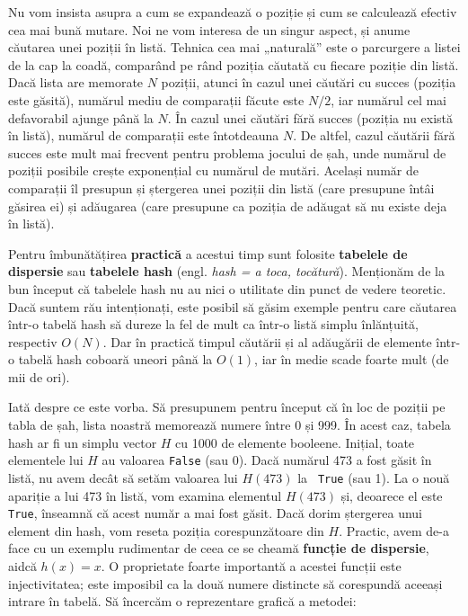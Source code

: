Nu vom insista asupra a cum se expandează o poziție și cum se calculează
efectiv cea mai bună mutare. Noi ne vom interesa de un singur aspect, și anume
căutarea unei poziții în listă. Tehnica cea mai „naturală” este o parcurgere a
listei de la cap la coadă, comparând pe rând poziția căutată cu fiecare
poziție din listă. Dacă lista are memorate $N$ poziții, atunci în cazul unei
căutări cu succes (poziția este găsită), numărul mediu de comparații făcute
este $N/2$, iar numărul cel mai defavorabil ajunge până la $N$. În cazul unei
căutări fără succes (poziția nu există în listă), numărul de comparații este
întotdeauna $N$. De altfel, cazul căutării fără succes este mult mai frecvent
pentru problema jocului de șah, unde numărul de poziții posibile crește
exponențial cu numărul de mutări. Același număr de comparații îl presupun și
ștergerea unei poziții din listă (care presupune întâi găsirea ei) și
adăugarea (care presupune ca poziția de adăugat să nu existe deja în listă).

Pentru îmbunătățirea {\bf practică} a acestui timp sunt folosite {\bf tabelele
  de dispersie} sau {\bf tabelele hash} (engl. {\it hash = a toca,
  tocătură}). Menționăm de la bun început că tabelele hash nu au nici o
utilitate din punct de vedere teoretic. Dacă suntem rău intenționați, este
posibil să găsim exemple pentru care căutarea într-o tabelă hash să dureze la
fel de mult ca într-o listă simplu înlănțuită, respectiv $O(N)$. Dar în
practică timpul căutării și al adăugării de elemente într-o tabelă hash
coboară uneori până la $O(1)$, iar în medie scade foarte mult (de mii de ori).

Iată despre ce este vorba. Să presupunem pentru început că în loc de poziții
pe tabla de șah, lista noastră memorează numere între 0 și 999. În acest caz,
tabela hash ar fi un simplu vector $H$ cu 1000 de elemente booleene. Inițial,
toate elementele lui $H$ au valoarea {\tt False} (sau 0). Dacă numărul 473 a
fost găsit în listă, nu avem decât să setăm valoarea lui $H(473)$ la {\tt
  True} (sau 1). La o nouă apariție a lui 473 în listă, vom examina elementul
$H(473)$ și, deoarece el este {\tt True}, înseamnă că acest număr a mai fost
găsit. Dacă dorim ștergerea unui element din hash, vom reseta poziția
corespunzătoare din $H$. Practic, avem de-a face cu un exemplu rudimentar de
ceea ce se cheamă {\bf funcție de dispersie}, aidcă $h(x) = x$. O proprietate
foarte importantă a acestei funcții este injectivitatea; este imposibil ca la
două numere distincte să corespundă aceeași intrare în tabelă. Să încercăm o
reprezentare grafică a metodei:

